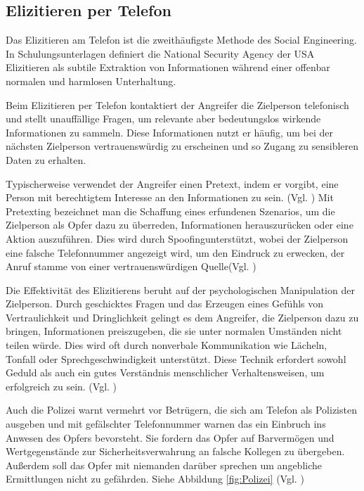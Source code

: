 \subsection{Elizitieren per Telefon}

Das \glqq Elizitieren\grqq{} am Telefon ist die zweithäufigste Methode des Social Engineering.\cite{eliAmTel} \glqq In Schulungsunterlagen definiert die National Security Agency der USA Elizitieren als \glq subtile Extraktion von Informationen während einer offenbar normalen und harmlosen Unterhaltung\grq\grqq{}.\cite{elizitieren}

Beim Elizitieren per Telefon kontaktiert der Angreifer die Zielperson telefonisch und stellt unauffällige Fragen, um relevante aber bedeutungslos wirkende Informationen zu sammeln. Diese Informationen nutzt er häufig, um bei der nächsten Zielperson vertrauenswürdig zu erscheinen und so Zugang zu sensibleren Daten zu erhalten.

Typischerweise verwendet der Angreifer einen \glqq Pretext\grqq{}, indem er vorgibt, eine Person mit berechtigtem Interesse an den Informationen zu sein. (Vgl. \cite{eliz}) \glqq Mit Pretexting bezeichnet man die Schaffung eines erfundenen Szenarios, um die Zielperson als Opfer dazu zu überreden, Informationen herauszurücken oder eine Aktion auszuführen.\grqq{} \cite{pretext} Dies wird durch \glqq Spoofing\grqq{}unterstützt, wobei der Zielperson eine falsche Telefonnummer angezeigt wird, um den Eindruck zu erwecken, der Anruf stamme von einer vertrauenswürdigen Quelle(Vgl. \cite{spoofing})

Die Effektivität des Elizitierens beruht auf der psychologischen Manipulation der Zielperson. Durch geschicktes Fragen und das Erzeugen eines Gefühls von Vertraulichkeit und Dringlichkeit gelingt es dem Angreifer, die Zielperson dazu zu bringen, Informationen preiszugeben, die sie unter normalen Umständen nicht teilen würde. Dies wird oft durch nonverbale Kommunikation wie Lächeln, Tonfall oder Sprechgeschwindigkeit unterstützt. Diese Technik erfordert sowohl Geduld als auch ein gutes Verständnis menschlicher Verhaltensweisen, um erfolgreich zu sein. (Vgl. \cite{elizitieren1})

Auch die Polizei warnt vermehrt vor Betrügern, die sich am Telefon als Polizisten ausgeben und mit gefälschter Telefonnummer warnen das ein Einbruch ins Anwesen des Opfers bevorsteht. Sie fordern das Opfer auf Barvermögen und Wertgegenstände zur Sicherheitsverwahrung an falsche Kollegen zu übergeben. Außerdem soll das Opfer mit niemanden darüber sprechen um angebliche Ermittlungen nicht zu gefährden. Siehe Abbildung \ref{fig:Polizei} (Vgl. \cite{polizeibeamte})   

